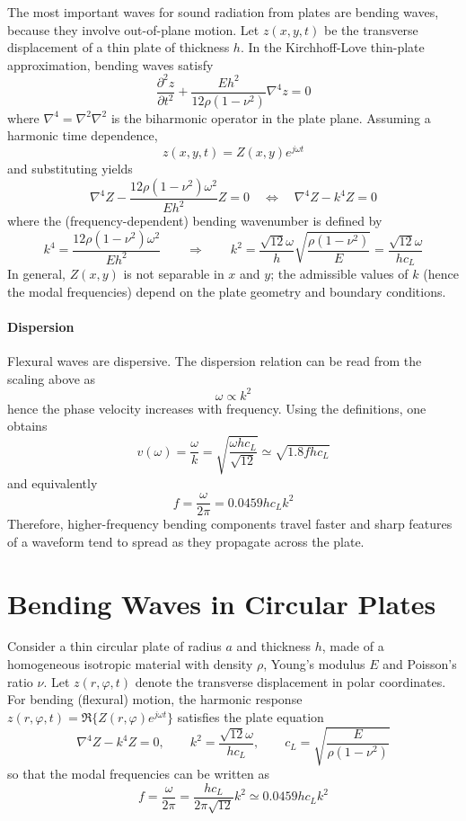 The most important waves for sound radiation from plates are bending waves, because they involve out-of-plane motion. Let \( z(x,y,t) \) be the transverse displacement of a thin plate of thickness \( h \). In the Kirchhoff-Love thin-plate approximation, bending waves satisfy
\[
\frac{\partial^{2}z}{\partial t^{2}}
+
\frac{E h^{2}}{12\rho(1-\nu^{2})}\nabla^{4}z
 = 0
\]
where \( \nabla^{4} = \nabla^{2}\nabla^{2} \) is the biharmonic operator in the plate plane. Assuming a harmonic time dependence,
\[
z(x,y,t) = Z(x,y)e^{j\omega t}
\]
and substituting yields
\[
\nabla^{4}Z-\frac{12\rho(1-\nu^{2})\omega^{2}}{Eh^{2}}Z = 0
\quad\Longleftrightarrow\quad
\nabla^{4}Z-k^{4}Z = 0
\]
where the (frequency-dependent) bending wavenumber is defined by
\[
k^{4} = \frac{12\rho(1-\nu^{2})\omega^{2}}{Eh^{2}}
\qquad\Rightarrow\qquad
k^{2} = \frac{\sqrt{12}\omega}{h}\sqrt{\frac{\rho(1-\nu^{2})}{E}}
 = \frac{\sqrt{12}\omega}{hc_L}
\]
In general, \( Z(x,y) \) is not separable in \( x \) and \( y \); the admissible values of \( k \) (hence the modal frequencies) depend on the plate geometry and boundary conditions.

\paragraph{Dispersion} Flexural waves are dispersive. The dispersion relation can be read from the scaling above as
\[
\omega  \propto k^{2}
\]
hence the phase velocity increases with frequency. Using the definitions, one obtains
\[
v(\omega) = \frac{\omega}{k}
 = \sqrt{\frac{\omega h c_L}{\sqrt{12}}}
 \simeq \sqrt{1.8fhc_L}
\]
and equivalently
\[
f = \frac{\omega}{2\pi} = 0.0459hc_Lk^{2}
\]
Therefore, higher-frequency bending components travel faster and sharp features of a waveform tend to spread as they propagate across the plate. 

\section{Bending Waves in Circular Plates}

Consider a thin circular plate of radius \( a \) and thickness \( h \), made of a homogeneous isotropic material with density \( \rho \), Young's modulus \( E \) and Poisson's ratio \( \nu \). Let \( z(r,\varphi,t) \) denote the transverse displacement in polar coordinates. For bending (flexural) motion, the harmonic response \( z(r,\varphi,t) = \Re\{Z(r,\varphi)e^{j\omega t}\} \) satisfies the plate equation
\[
\nabla^{4}Z-k^{4}Z = 0,
\qquad
k^{2} = \frac{\sqrt{12}\omega}{hc_L},
\qquad
c_L = \sqrt{\frac{E}{\rho(1-\nu^{2})}}
\]
so that the modal frequencies can be written as
\[
f = \frac{\omega}{2\pi}
 = \frac{hc_L}{2\pi\sqrt{12}}k^{2}
 \simeq 0.0459hc_Lk^{2}
\]

